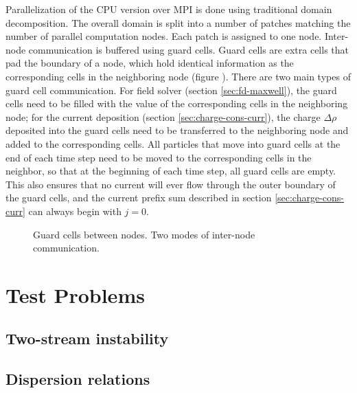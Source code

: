 Parallelization of the CPU version over MPI is done using traditional domain
decomposition. The overall domain is split into a number of patches matching the
number of parallel computation nodes. Each patch is assigned to one node.
Inter-node communication is buffered using guard cells. Guard cells are extra
cells that pad the boundary of a node, which hold identical information as the
corresponding cells in the neighboring node (figure ). There are two main types of
guard cell communication. For field solver (section \ref{sec:fd-maxwell}), the
guard cells need to be filled with the value of the corresponding cells in the
neighboring node; for the current deposition (section
\ref{sec:charge-cons-curr}), the charge $\Delta \rho$ deposited into the guard
cells need to be transferred to the neighboring node and added to the
corresponding cells. All particles that move into guard cells at the end of each
time step need to be moved to the corresponding cells in the neighbor, so that
at the beginning of each time step, all guard cells are empty. This also ensures
that no current will ever flow through the outer boundary of the guard cells,
and the current prefix sum described in section \ref{sec:charge-cons-curr} can
always begin with $j=0$.

\begin{figure}[h]
  \centering

  \caption{Guard cells between nodes. Two modes of inter-node communication.}
  \label{fig:guard-cells}
\end{figure}




\section{Test Problems}
\label{sec:test-problems}

\subsection{Two-stream instability}
\label{sec:test-two-stream}

\subsection{Dispersion relations}
\label{sec:test-dispersion}

